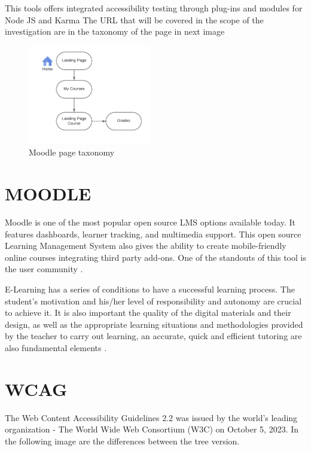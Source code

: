 \documentclass{IEEEtran}
\begin{document}
This tools offers integrated accessibility testing through plug-ins and modules for Node JS and Karma \cite{Karma}
The URL that will be covered in the scope of the investigation are in the taxonomy of the page in next image

\begin{figure}[H]
    \includegraphics[width=0.48\textwidth]{images/figure1.png}
    \caption{Moodle page taxonomy}
    \label{fig:figure1}
\end{figure}

\section{MOODLE}
Moodle is one of the most popular open source LMS options available today. It features dashboards, learner tracking, and multimedia support. This open source Learning Management System also gives the ability to create mobile-friendly online courses integrating third party add-ons. One of the standouts of this tool is the user community \cite{Moodle2024}.

E-Learning has a series of conditions to have a successful learning process. The student's motivation and his/her level of responsibility and autonomy are crucial to achieve it. It is also important the quality of the digital materials and their design, as well as the appropriate learning situations and methodologies provided by the teacher to carry out learning, an accurate, quick and efficient tutoring are also fundamental elements \cite{Rahman2019}.

\section{WCAG}
The Web Content Accessibility Guidelines 2.2 \cite{W3C2023} was issued by the world's leading organization - The World Wide Web Consortium (W3C) on October 5, 2023.  In the following image are the differences between the tree version.
\end{document}
